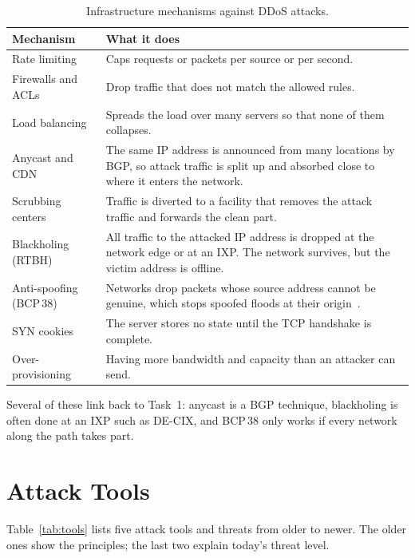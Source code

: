 \begin{table}[ht]
	\centering
	\small
	\begin{tabularx}{\textwidth}{@{}lX@{}}
		\toprule
		Mechanism & What it does \\
		\midrule
		Rate limiting & Caps requests or packets per source or per second. \\
		Firewalls and ACLs & Drop traffic that does not match the allowed rules. \\
		Load balancing & Spreads the load over many servers so that none of them collapses. \\
		Anycast and CDN & The same IP address is announced from many locations by BGP, so attack traffic is split up and absorbed close to where it enters the network. \\
		Scrubbing centers & Traffic is diverted to a facility that removes the attack traffic and forwards the clean part. \\
		Blackholing (RTBH) & All traffic to the attacked IP address is dropped at the network edge or at an IXP. The network survives, but the victim address is offline. \\
		Anti-spoofing (BCP\,38) & Networks drop packets whose source address cannot be genuine, which stops spoofed floods at their origin~\cite{rfc2827}. \\
		SYN cookies & The server stores no state until the TCP handshake is complete. \\
		Over-provisioning & Having more bandwidth and capacity than an attacker can send. \\
		\bottomrule
	\end{tabularx}
	\caption{Infrastructure mechanisms against DDoS attacks.}
	\label{tab:infra}
\end{table}

Several of these link back to Task~1: anycast is a BGP technique, blackholing is often done at an IXP such as DE-CIX, and BCP\,38 only works if every network along the path takes part.

\section{Attack Tools}\label{sec:tools}

Table~\ref{tab:tools} lists five attack tools and threats from older to newer. The older ones show the principles; the last two explain today's threat level.

